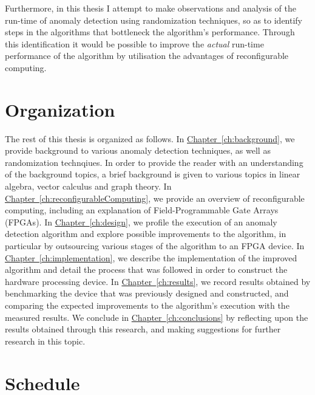 Furthermore, in this thesis I attempt to make observations and analysis of the 
run-time of anomaly detection using randomization techniques, so as to identify
steps in the algorithms that bottleneck the algorithm's performance. Through 
this identification it would be possible to improve the \emph{actual} run-time 
performance of the algorithm by utilisation the advantages of reconfigurable 
computing.

\section{Organization}
\label{sec:organization}
The rest of this thesis is organized as follows. In \hyperref[ch:background]
{Chapter~\ref{ch:background}}, we provide background to various anomaly 
detection techniques, as well as randomization technqiues. In order to provide 
the reader with an understanding of the background topics, a brief background is
given to various topics in linear algebra, vector calculus and graph theory. In
\hyperref[ch:reconfigurableComputing]{Chapter~\ref{ch:reconfigurableComputing}}, 
we provide an overview of reconfigurable computing, including an explanation of 
Field-Programmable Gate Arrays (FPGAs). In \hyperref[ch:design]
{Chapter~\ref{ch:design}}, we profile the execution of an anomaly detection 
algorithm and explore possible improvements to the algorithm, in particular by 
outsourcing various stages of the algorithm to an FPGA device. In 
\hyperref[ch:implementation]{Chapter~\ref{ch:implementation}}, we describe the 
implementation of the improved algorithm and detail the process that was 
followed in order to construct the hardware processing device. In 
\hyperref[ch:results]{Chapter~\ref{ch:results}}, we record results obtained by 
benchmarking the device that was previously designed and constructed, and 
comparing the expected improvements to the algorithm's execution with the 
measured results. We conclude in \hyperref[ch:conclusions]
{Chapter~\ref{ch:conclusions}} by reflecting upon the results obtained through 
this research, and making suggestions for further research in this topic.
 
\section{Schedule}
\label{sec:schedule}

